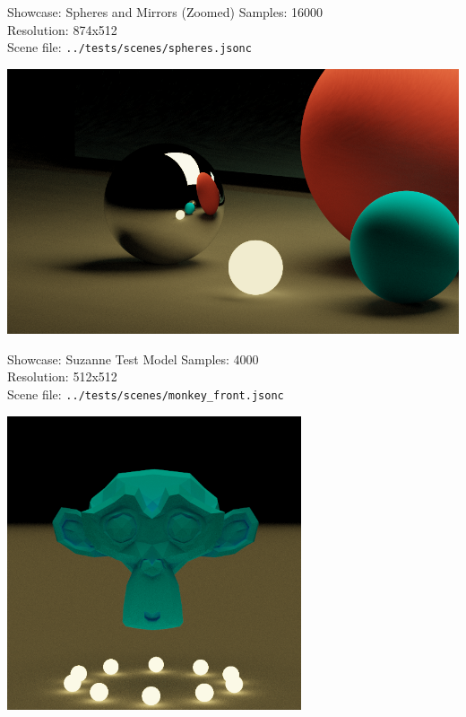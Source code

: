 \documentclass{beamer}
\begin{document}
\begin{frame}{Showcase: Spheres and Mirrors (Zoomed)}
    \footnotesize{
    Samples: 16000\\
    Resolution: 874x512\\
    Scene file: \texttt{../tests/scenes/spheres.jsonc}
    }
    \begin{center}
        \includegraphics[width=1.00\textwidth]{../img/spheres-2.png}
    \end{center}
\end{frame}

\begin{frame}{Showcase: Suzanne Test Model}
    \footnotesize{
    Samples: 4000\\
    Resolution: 512x512\\
    Scene file: \texttt{../tests/scenes/monkey\_front.jsonc}
    }
    \begin{center}
        \includegraphics[width=0.65\textwidth]{../img/suzanne_blue.png}
    \end{center}
\end{frame}
\end{document}
